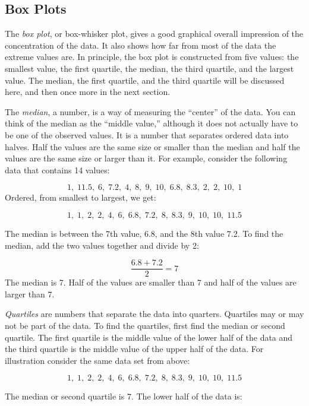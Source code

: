 \documentclass[]{krantz}
\theoremstyle{definition}
\theoremstyle{definition}
\theoremstyle{definition}
\theoremstyle{remark}
\begin{document}
\hypertarget{box-plots}{%
\subsection{Box Plots}\label{box-plots}}

The \emph{box plot}, or box-whisker plot, gives a good graphical overall
impression of the concentration of the data. It also shows how far from
most of the data the extreme values are. In principle, the box plot is
constructed from five values: the smallest value, the first quartile,
the median, the third quartile, and the largest value. The median, the
first quartile, and the third quartile will be discussed here, and then
once more in the next section.

The \emph{median}, a number, is a way of measuring the ``center'' of the data.
You can think of the median as the ``middle value,'' although it does not
actually have to be one of the observed values. It is a number that
separates ordered data into halves. Half the values are the same size or
smaller than the median and half the values are the same size or larger
than it. For example, consider the following data that contains 14
values:

\[1,\;   11.5,\;   6,\;   7.2,\;   4,\;   8,\;   9,\;   10,\;   6.8,\;   8.3,\;   2,\;   2,\;   10,\;   1\]
Ordered, from smallest to largest, we get:

\[1,\;   1,\;   2,\;   2,\;   4,\;   6,\;   6.8,\;   7.2,\;   8,\;   8.3,\;   9,\;   10,\;   10,\;   11.5\]

The median is between the 7th value, 6.8, and the 8th value 7.2. To find
the median, add the two values together and divide by 2:

\[\frac{6.8+7.2}{2} = 7\] The median is 7. Half of the values are
smaller than 7 and half of the values are larger than 7.

\emph{Quartiles} are numbers that separate the data into quarters. Quartiles
may or may not be part of the data. To find the quartiles, first find
the median or second quartile. The first quartile is the middle value of
the lower half of the data and the third quartile is the middle value of
the upper half of the data. For illustration consider the same data set
from above:

\[1,\;   1,\;   2,\;   2,\;   4,\;   6,\;   6.8,\;   7.2,\;   8,\;   8.3,\;   9,\;   10,\;   10,\;   11.5\]

The median or second quartile is 7. The lower half of the data is:
\end{document}
